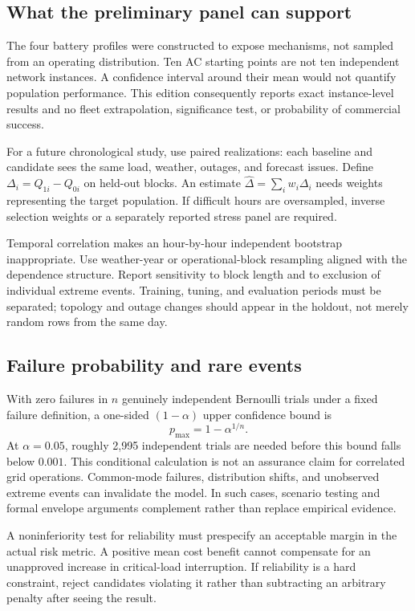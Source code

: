 \documentclass[11pt,letterpaper]{article}
\begin{document}
\subsection{What the preliminary panel can support}
The four battery profiles were constructed to expose mechanisms, not sampled from an operating distribution. Ten AC starting points are not ten independent network instances. A confidence interval around their mean would not quantify population performance. This edition consequently reports exact instance-level results and no fleet extrapolation, significance test, or probability of commercial success.

For a future chronological study, use paired realizations: each baseline and candidate sees the same load, weather, outages, and forecast issues. Define $\Delta_i=Q_{1i}-Q_{0i}$ on held-out blocks. An estimate $\hat\Delta=\sum_iw_i\Delta_i$ needs weights representing the target population. If difficult hours are oversampled, inverse selection weights or a separately reported stress panel are required.

Temporal correlation makes an hour-by-hour independent bootstrap inappropriate. Use weather-year or operational-block resampling aligned with the dependence structure. Report sensitivity to block length and to exclusion of individual extreme events. Training, tuning, and evaluation periods must be separated; topology and outage changes should appear in the holdout, not merely random rows from the same day.

\subsection{Failure probability and rare events}
With zero failures in $n$ genuinely independent Bernoulli trials under a fixed failure definition, a one-sided $(1-\alpha)$ upper confidence bound is
\[
 p_{\max}=1-\alpha^{1/n}.
\]
At $\alpha=0.05$, roughly 2,995 independent trials are needed before this bound falls below $0.001$. This conditional calculation is not an assurance claim for correlated grid operations. Common-mode failures, distribution shifts, and unobserved extreme events can invalidate the model. In such cases, scenario testing and formal envelope arguments complement rather than replace empirical evidence.

A noninferiority test for reliability must prespecify an acceptable margin in the actual risk metric. A positive mean cost benefit cannot compensate for an unapproved increase in critical-load interruption. If reliability is a hard constraint, reject candidates violating it rather than subtracting an arbitrary penalty after seeing the result.
\end{document}
